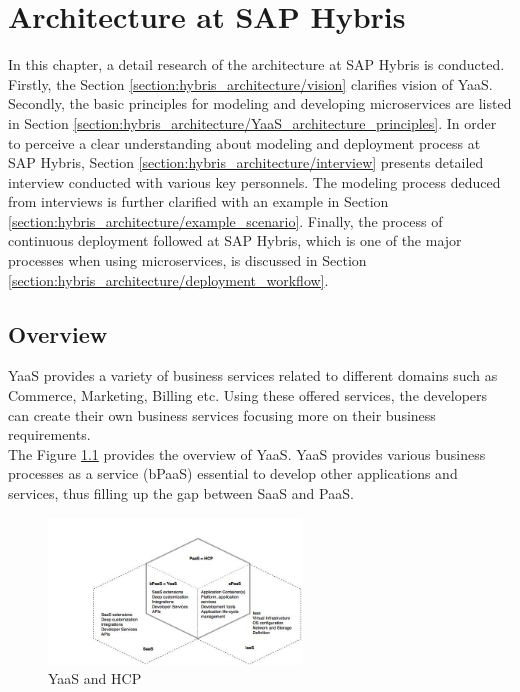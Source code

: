 \chapter{Architecture at SAP Hybris}\label{chapter:hybris_architecture}
In this chapter, a detail research of the architecture at SAP Hybris is conducted. Firstly, the Section \ref{section:hybris_architecture/vision} clarifies vision of \acrshort{YaaS}. Secondly, the basic principles for modeling and developing microservices are listed in Section \ref{section:hybris_architecture/YaaS_architecture_principles}. In order to perceive a clear understanding about modeling and deployment process at SAP Hybris, Section \ref{section:hybris_architecture/interview} presents detailed interview conducted with various key personnels. The modeling process deduced from interviews is further clarified with an example in Section \ref{section:hybris_architecture/example_scenario}. Finally, the process of continuous deployment followed at SAP Hybris, which is one of the major processes when using microservices, is discussed in Section \ref{section:hybris_architecture/deployment_workflow}.
\section{Overview}\label{section:hybris_architecture/overview}
\acrshort{YaaS} provides a variety of business services related to different domains such as Commerce, Marketing, Billing etc. Using these offered services, the developers can create their own business services focusing more on their business requirements.\\
The Figure \ref{fig:hybris_architecture/overview/yaas_overview} provides the overview of \acrshort{YaaS}. \acrshort{YaaS} provides various business processes as a service (bPaaS) essential to develop other applications and services, thus filling up the gap between \acrshort{SaaS} and \acrshort{PaaS}.
\begin{figure}[H]
\begin{center}
\includegraphics[width=0.6\textwidth]{figures/hybris-architecture-one}
\caption{\acrshort{YaaS} and \acrshort{HCP} \cite{Hirsch:2015aa}}
\label{fig:hybris_architecture/overview/yaas_overview}
\end{center}
\end{figure}
\\
